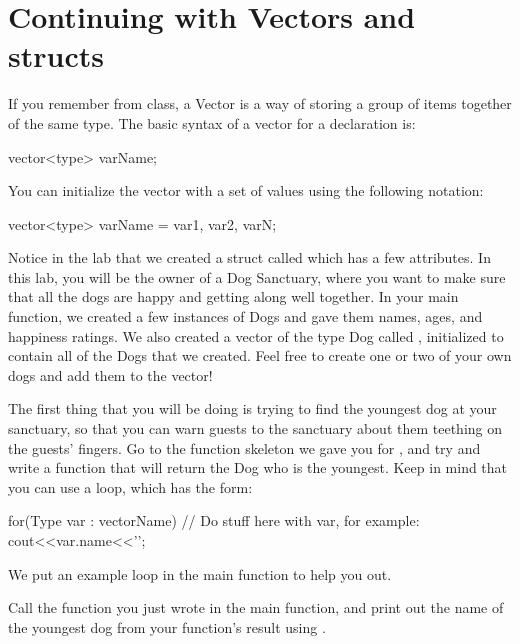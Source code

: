 \documentclass{tufte-handout}
\begin{document}
\section{Continuing with Vectors and structs}
If you remember from class, a Vector is a way of storing a group of items together of the same type.  The basic syntax of a vector for a declaration is:
\begin{Code}
vector<type> varName;
\end{Code}

You can initialize the vector with a set of values using the following notation:
\begin{Code}
vector<type> varName = {var1, var2, varN};
\end{Code}

Notice in the lab that we created a struct called  which has a few attributes.  In this lab, you will be the owner of a Dog Sanctuary, where you want to make sure that all the dogs are happy and getting along well together.  In your main function, we created a few instances of Dogs and gave them names, ages, and happiness ratings.  We also created a vector of the type Dog called , initialized to contain all of the Dogs that we created.  Feel free to create one or two of your own dogs and add them to the vector!


The first thing that you will be doing is trying to find the youngest dog at your sanctuary, so that you can warn guests to the sanctuary about them teething on the guests' fingers.  Go to the function skeleton we gave you for , and try and write a function that will return the Dog who is the youngest. Keep in mind that you can use a  loop, which has the form:
\begin{Code}
    for(Type var : vectorName){
        // Do stuff here with var, for example:
        cout<<var.name<<'\n';
    }
\end{Code}

We put an example  loop in the main function to help you out.

Call the function you just wrote in the main function, and print out the name of the youngest dog from your function's result using .  
\end{document}
